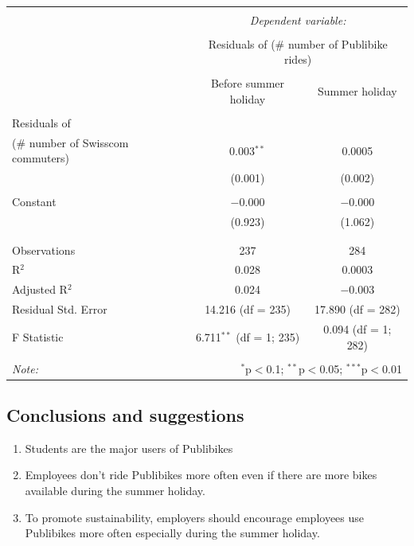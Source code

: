 \documentclass{article}
\begin{document}
\begin{table}[!htbp] \centering 
  \caption{} 
  \label{} 
\begin{tabular}{@{\extracolsep{5pt}}lcc} 
\\[-1.8ex]\hline 
\hline \\[-1.8ex] 
 & \multicolumn{2}{c}{\textit{Dependent variable:}} \\ 
\cline{2-3} 
\\[-1.8ex] & \multicolumn{2}{c}{Residuals of (\# number of Publibike rides)} \\ 
\\[-1.8ex] & Before summer holiday & Summer holiday\\ 
\hline \\[-1.8ex] 
 Residuals of \\
 (\# number of Swisscom commuters) & 0.003$^{**}$ & 0.0005 \\ 
  & (0.001) & (0.002) \\ 
  & & \\ 
 Constant & $-$0.000 & $-$0.000 \\ 
  & (0.923) & (1.062) \\ 
  & & \\ 
\hline \\[-1.8ex] 
Observations & 237 & 284 \\ 
R$^{2}$ & 0.028 & 0.0003 \\ 
Adjusted R$^{2}$ & 0.024 & $-$0.003 \\ 
Residual Std. Error & 14.216 (df = 235) & 17.890 (df = 282) \\ 
F Statistic & 6.711$^{**}$ (df = 1; 235) & 0.094 (df = 1; 282) \\ 
\hline 
\hline \\[-1.8ex] 
\textit{Note:}  & \multicolumn{2}{r}{$^{*}$p$<$0.1; $^{**}$p$<$0.05; $^{***}$p$<$0.01} \\ 
\end{tabular} 
\end{table} 

\subsection{Conclusions and suggestions}
\begin{enumerate}
    \item Students are the major users of Publibikes
    \item Employees don't ride Publibikes more often even if there are more bikes available during the summer holiday.
    \item To promote sustainability, employers should encourage employees use Publibikes more often especially during the summer holiday.
\end{enumerate}
\end{document}
